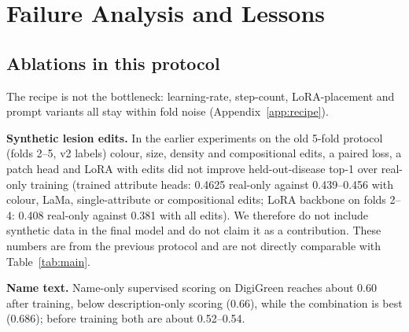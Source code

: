\documentclass[11pt]{article}
\begin{document}
\section{Failure Analysis and Lessons}\label{sec:fail}
\subsection{Ablations in this protocol}\label{sec:abl}
The recipe is not the bottleneck: learning-rate, step-count, LoRA-placement and prompt variants all stay within fold noise (Appendix~\ref{app:recipe}).

\textbf{Synthetic lesion edits.} In the earlier experiments on the old 5-fold protocol (folds 2--5, v2 labels) colour, size, density and compositional edits, a paired loss, a patch head and LoRA with edits did not improve held-out-disease top-1 over real-only training (trained attribute heads: 0.4625 real-only against 0.439--0.456 with colour, LaMa, single-attribute or compositional edits; LoRA backbone on folds 2--4: 0.408 real-only against 0.381 with all edits). We therefore do not include synthetic data in the final model and do not claim it as a contribution. These numbers are from the previous protocol and are not directly comparable with Table~\ref{tab:main}.

\textbf{Name text.} Name-only supervised scoring on DigiGreen reaches about 0.60 after training, below description-only scoring (0.66), while the combination is best (0.686); before training both are about 0.52--0.54.
\end{document}

